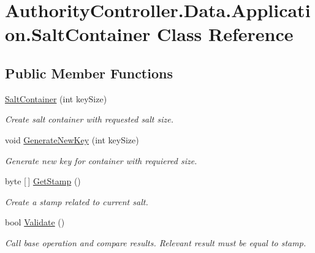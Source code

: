 \hypertarget{class_authority_controller_1_1_data_1_1_application_1_1_salt_container}{}\section{Authority\+Controller.\+Data.\+Application.\+Salt\+Container Class Reference}
\label{class_authority_controller_1_1_data_1_1_application_1_1_salt_container}
\subsection*{Public Member Functions}
\begin{DoxyCompactItemize}
\item 
\mbox{\hyperlink{class_authority_controller_1_1_data_1_1_application_1_1_salt_container_a0bbc5729faf6cdce0798360552359777}{Salt\+Container}} (int key\+Size)
\begin{DoxyCompactList}\small\item\em Create salt container with requested salt size. \end{DoxyCompactList}\item 
void \mbox{\hyperlink{class_authority_controller_1_1_data_1_1_application_1_1_salt_container_a372e31be50989b8e0c4b2e78e59e0d3b}{Generate\+New\+Key}} (int key\+Size)
\begin{DoxyCompactList}\small\item\em Generate new key for container with requiered size. \end{DoxyCompactList}\item 
byte \mbox{[}$\,$\mbox{]} \mbox{\hyperlink{class_authority_controller_1_1_data_1_1_application_1_1_salt_container_a193637ef347a3610305b75994c483305}{Get\+Stamp}} ()
\begin{DoxyCompactList}\small\item\em Create a stamp related to current salt. \end{DoxyCompactList}\item 
bool \mbox{\hyperlink{class_authority_controller_1_1_data_1_1_application_1_1_salt_container_a47a251ef343c25419d77b23dc28a50c0}{Validate}} ()
\begin{DoxyCompactList}\small\item\em Call base operation and compare results. Relevant result must be equal to stamp. \end{DoxyCompactList}\end{DoxyCompactItemize}
